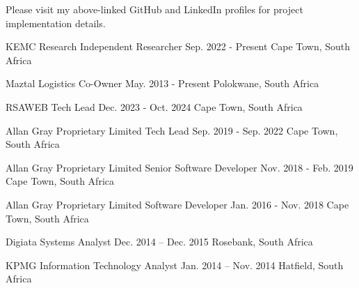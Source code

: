     \begin{cvparagraph}

        \:\:\:\:\:\:\:\:\:\:\:\:\:\:\:\:\:\:\:\:\:\:\:\:\:\:\:\:\:\:\:\:\:\:\:\:\:\:\:\:\:\:\:\:\:\:Please visit my above-linked GitHub and LinkedIn profiles for project implementation details.
    \end{cvparagraph}
    \begin{cventries}
        \cventry
            {KEMC Research}
            {Independent Researcher}
            {Sep. 2022 - Present}
            {Cape Town, South Africa}
            {}

        \cventry
            {Maztal Logistics}
            {Co-Owner}
            {May. 2013 - Present}
            {Polokwane, South Africa}
            {}

        \cventry
            {RSAWEB}
            {Tech Lead}
            {Dec. 2023 - Oct. 2024}
            {Cape Town, South Africa}
            {}

        \cventry
            {Allan Gray Proprietary Limited}
            {Tech Lead}
            {Sep. 2019 - Sep. 2022}
            {Cape Town, South Africa}
            {}

        \cventry
            {Allan Gray Proprietary Limited}
            {Senior Software Developer}
            {Nov. 2018 - Feb. 2019}
            {Cape Town, South Africa}
            {}

        \cventry
            {Allan Gray Proprietary Limited}
            {Software Developer}
            {Jan. 2016 - Nov. 2018}
            {Cape Town, South Africa}
            {}

        \cventry
            {Digiata}
            {Systems Analyst}
            {Dec. 2014 – Dec. 2015}
            {Rosebank, South Africa}
            {}

        \cventry
            {KPMG}
            {Information Technology Analyst}
            {Jan. 2014 – Nov. 2014}
            {Hatfield, South Africa}
            {}
    \end{cventries}

